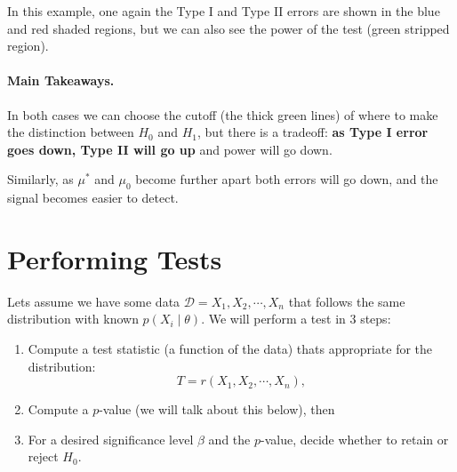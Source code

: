 \begin{center}
\end{center}

In this example, one again the Type I and Type II errors are shown in the blue and red shaded regions, 
but we can also see the power of the test (green stripped region). 

\paragraph{Main Takeaways. }
In both cases we can choose the cutoff (the thick green lines) of where to make the distinction between $H_0$ and $H_1$, 
but there is a tradeoff: 
\textbf{as Type I error goes down, Type II will go up} and power will go down. 

Similarly, as $\mu^*$ and $\mu_0$ become further apart both errors will go down, and the signal becomes easier to detect. 

\section{Performing Tests}

Lets assume we have some data $\mathcal{D} = X_1,X_2,\cdots,X_n$ that follows the same distribution with known $p(X_i\mid\theta)$.
We will perform a test in 3 steps:
\begin{enumerate}
\item Compute a test statistic (a function of the data) thats appropriate for the distribution: \[T = r(X_1,X_2,\cdots,X_n),\]
\item Compute a $p$-value (we will talk about this below), then 
\item For a desired significance level $\beta$ and the $p$-value, decide whether to retain or reject $H_0$. 
\end{enumerate}


